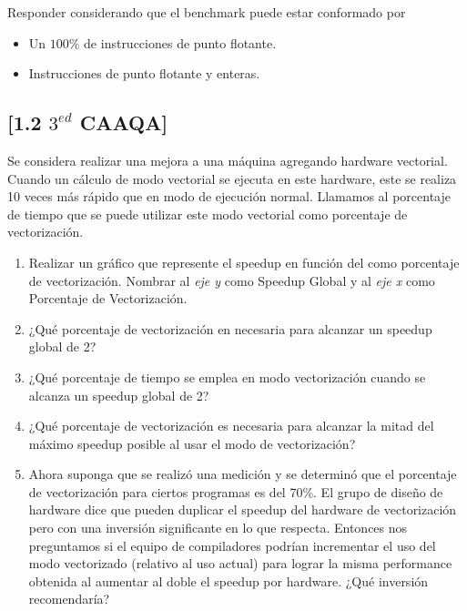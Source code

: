 Responder considerando que el benchmark puede estar conformado por 
	
\begin{itemize}
    \item Un $100\%$ de instrucciones de punto flotante.
    \item Instrucciones de punto flotante y enteras.
\end{itemize}

\subsection{[1.2 $3^{ed}$ CAAQA]}
Se considera realizar una mejora a una máquina agregando hardware vectorial. Cuando un cálculo de modo vectorial se ejecuta en este hardware, este se realiza 10 veces más rápido que en modo de ejecución normal. Llamamos al porcentaje de tiempo que se puede utilizar este modo vectorial como porcentaje de vectorización.

\begin{enumerate}
 \item Realizar un gráfico que represente el speedup en función del como porcentaje de vectorización. Nombrar al \textit{eje y} como Speedup Global y al \textit{eje x} como Porcentaje de Vectorización.
 
 \item ¿Qué porcentaje de vectorización en necesaria para alcanzar un speedup global de 2?
 
 \item ¿Qué porcentaje de tiempo se emplea en modo vectorización cuando se alcanza un speedup global de 2?
 
 \item ¿Qué porcentaje de vectorización es necesaria para alcanzar la mitad del máximo speedup posible al usar el modo de vectorización?
 
 \item Ahora suponga que se realizó una medición y se determinó que el porcentaje de vectorización para ciertos programas es del 70\%. El grupo de diseño de hardware dice que pueden duplicar el speedup del hardware de vectorización pero con una inversión significante en lo que respecta. Entonces nos preguntamos si el equipo de compiladores podrían incrementar el uso del modo vectorizado (relativo al uso actual) para lograr la misma performance obtenida al aumentar al doble el speedup por hardware. ¿Qué inversión recomendaría?  
\end{enumerate}


